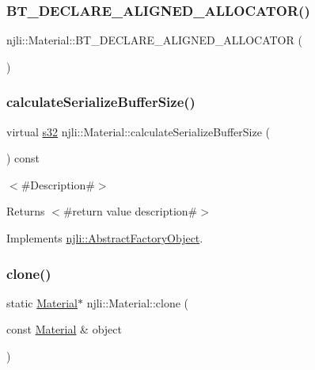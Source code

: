 \subsubsection{\texorpdfstring{B\+T\+\_\+\+D\+E\+C\+L\+A\+R\+E\+\_\+\+A\+L\+I\+G\+N\+E\+D\+\_\+\+A\+L\+L\+O\+C\+A\+T\+O\+R()}{BT\_DECLARE\_ALIGNED\_ALLOCATOR()}}
{\footnotesize\ttfamily njli\+::\+Material\+::\+B\+T\+\_\+\+D\+E\+C\+L\+A\+R\+E\+\_\+\+A\+L\+I\+G\+N\+E\+D\+\_\+\+A\+L\+L\+O\+C\+A\+T\+OR (\begin{DoxyParamCaption}{ }\end{DoxyParamCaption})\hspace{0.3cm}{\ttfamily [protected]}}

\mbox{\label{classnjli_1_1_material_a07a92910ef8da284641f6eb70a30e3be}} 
\subsubsection{\texorpdfstring{calculate\+Serialize\+Buffer\+Size()}{calculateSerializeBufferSize()}}
{\footnotesize\ttfamily virtual \mbox{\hyperlink{_util_8h_aa62c75d314a0d1f37f79c4b73b2292e2}{s32}} njli\+::\+Material\+::calculate\+Serialize\+Buffer\+Size (\begin{DoxyParamCaption}{ }\end{DoxyParamCaption}) const\hspace{0.3cm}{\ttfamily [virtual]}}

$<$\#\+Description\#$>$

\begin{DoxyReturn}{Returns}
$<$\#return value description\#$>$ 
\end{DoxyReturn}


Implements \mbox{\hyperlink{classnjli_1_1_abstract_factory_object_a4763d05bc9dc37c559111f8bb30e1dd8}{njli\+::\+Abstract\+Factory\+Object}}.

\mbox{\label{classnjli_1_1_material_ae92845d754b6ff837489c461bb0072ee}} 
\subsubsection{\texorpdfstring{clone()}{clone()}}
{\footnotesize\ttfamily static \mbox{\hyperlink{classnjli_1_1_material}{Material}}$\ast$ njli\+::\+Material\+::clone (\begin{DoxyParamCaption}\item[{const \mbox{\hyperlink{classnjli_1_1_material}{Material}} \&}]{object }\end{DoxyParamCaption})\hspace{0.3cm}{\ttfamily [static]}}

